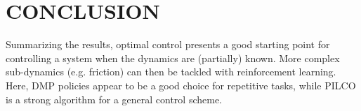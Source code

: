 \documentclass[letterpaper, 10 pt, conference]{ieeeconf}  %
\begin{document}

\section{CONCLUSION}
Summarizing the results, optimal control presents a good starting point for controlling a system when the dynamics are (partially) known. More complex sub-dynamics (e.g. friction) can then be tackled with reinforcement learning. Here, DMP policies appear to be a good choice for repetitive tasks, while PILCO is a strong algorithm for a general control scheme.
\end{document}
